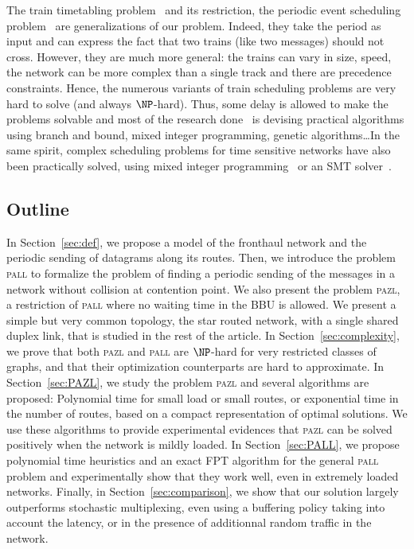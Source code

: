 \documentclass[a4paper,10pt]{journal}
\newcommand\pazl{\textsc{pazl}\xspace}
\newcommand\pall{\textsc{pall}\xspace}
\begin{document}
The train timetabling problem~\cite{lusby2011railway} and its restriction, the periodic event scheduling problem~\cite{serafini1989mathematical} are generalizations of our problem. Indeed, they take the period as input and can express the fact that two trains (like two messages) should not cross. However, they are much more general: the trains can vary in size, speed, the network can be more complex than a single track and there are precedence constraints. Hence, the numerous variants of train scheduling problems are very hard to solve (and always $\NP$-hard). Thus, some delay is allowed to make the problems solvable and most of the research done~\cite{lusby2011railway} is devising practical algorithms using branch and bound, mixed integer programming, genetic algorithms\dots  In the same spirit, complex scheduling problems for time sensitive networks have also been practically solved, using mixed integer programming~\cite{nayak2017incremental,steiner2018traffic} or an SMT solver~\cite{dos2019tsnsched}.


\subsection*{Outline}

 In Section~\ref{sec:def}, we propose a model of the fronthaul network and the periodic sending of datagrams along its routes. Then, we introduce the problem \pall to formalize the problem of finding a periodic sending of the messages in a network without collision at contention point. We also present the problem \pazl, a restriction of \pall where no waiting time in the BBU is allowed. We present a simple but very common topology, the star routed network, with a single shared duplex link, that is studied in the rest of the article.  In Section~\ref{sec:complexity}, we prove that both \pazl and \pall are $\NP$-hard for very restricted classes of graphs, and that their optimization counterparts are hard to approximate. 
 In Section~\ref{sec:PAZL}, we study the problem \pazl and several algorithms are proposed: Polynomial time for small load or small routes, or exponential time in the number of routes, based on a compact representation of optimal solutions. We use these algorithms to provide experimental evidences that \pazl can be solved positively when the network is mildly loaded. In Section~\ref{sec:PALL}, we propose polynomial time heuristics and an exact FPT algorithm for the general \pall problem and experimentally show that they work well, even in extremely loaded networks. 
Finally, in Section~\ref{sec:comparison}, we show that our solution largely outperforms stochastic multiplexing, even using a buffering policy taking into account the latency, or in the presence of additionnal random traffic in the network.
\end{document}
